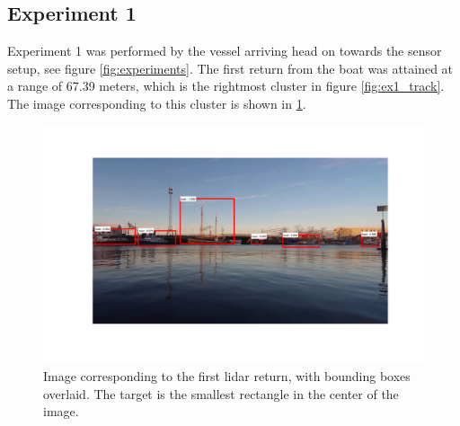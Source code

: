 \subsection{Experiment 1}
Experiment 1 was performed by the vessel arriving head on towards the sensor setup, see figure \ref{fig:experiments}.
The first return from the boat was attained at a range of 67.39 meters, which is the rightmost cluster in figure \ref{fig:ex1_track}. The image corresponding to this cluster is shown in \ref{fig:ex1_1}.
\begin{figure}[h]
		\centering
		\includegraphics[width=\linewidth]{fig/detection_1_exp_1_img.png}
		\caption{Image corresponding to the first lidar return, with bounding boxes overlaid. The target is the smallest rectangle in the center of the image.}
		\label{fig:ex1_1}
\end{figure}

